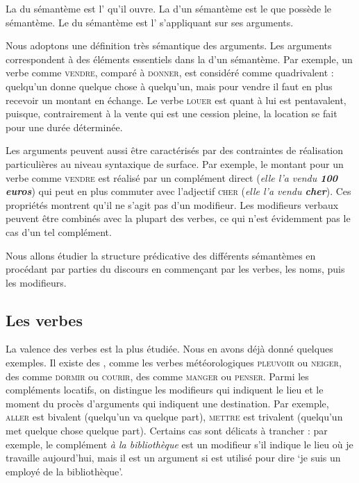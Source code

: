 {La  du sémantème est l’ qu’il ouvre. La  d’un sémantème est le  que possède le sémantème. Le  du sémantème est l’ s’appliquant sur ses arguments.}

Nous adoptons une définition très sémantique des arguments. Les arguments correspondent à des éléments essentiels dans la  d’un sémantème. Par exemple, un verbe comme \textsc{vendre}, comparé à \textsc{donner}, est considéré comme quadrivalent : quelqu’un donne quelque chose à quelqu’un, mais pour vendre il faut en plus recevoir un montant en échange. Le verbe \textsc{louer} est quant à lui est pentavalent, puisque, contrairement à la vente qui est une cession pleine, la location se fait pour une durée déterminée.

Les arguments peuvent aussi être caractérisés par des contraintes de réalisation particulières au niveau syntaxique de surface. Par exemple, le montant pour un verbe comme \textsc{vendre} est réalisé par un complément direct (\textit{elle l’a vendu \textbf{100 euros}}) qui peut en plus commuter avec l’adjectif \textsc{cher} (\textit{elle l’a vendu \textbf{cher}}). Ces propriétés montrent qu’il ne s’agit pas d’un modifieur. Les modifieurs verbaux peuvent être combinés avec la plupart des verbes, ce qui n’est évidemment pas le cas d’un tel complément.

Nous allons étudier la structure prédicative des différents sémantèmes en procédant par parties du discours en commençant par les verbes, les noms, puis les modifieurs.

\subsection{Les verbes}
La valence des verbes est la plus étudiée. Nous en avons déjà donné quelques exemples. Il existe des , comme les verbes météorologiques \textsc{pleuvoir} ou \textsc{neiger}, des  comme \textsc{dormir} ou \textsc{courir}, des  comme \textsc{manger} ou \textsc{penser}. Parmi les compléments locatifs, on distingue les modifieurs qui indiquent le lieu et le moment du procès d’arguments qui indiquent une destination. Par exemple, \textsc{aller} est bivalent (quelqu’un va quelque part), \textsc{mettre} est trivalent (quelqu’un met quelque chose quelque part). Certains cas sont délicats à trancher : par exemple, le complément \textit{à la bibliothèque} est un modifieur s’il indique le lieu où je travaille aujourd’hui, mais il est un argument si  est utilisé pour dire ‘je suis un employé de la bibliothèque’.

